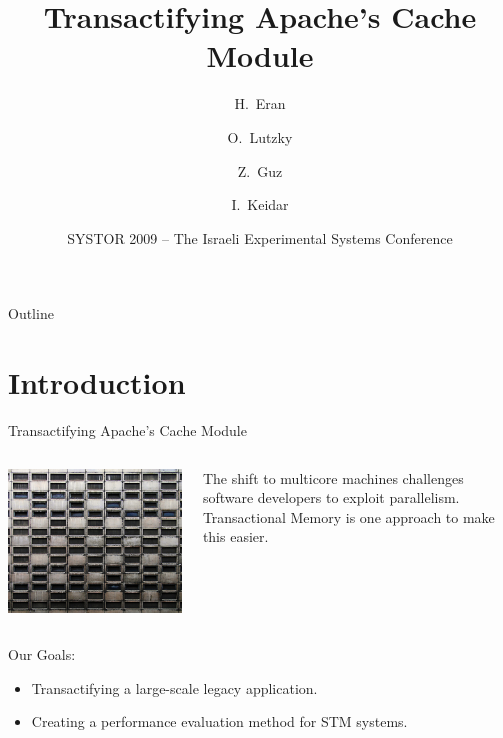 \documentclass[]{beamer}
\title{Transactifying Apache's Cache Module}
\author[Haggai Eran, Ohad Lutzky, Zvika Guz, Idit Keidar]
{H.~Eran \and O.~Lutzky \and Z.~Guz \and I.~Keidar}
\institute
{
    Department of Electrical Engineering\\
    Technion -- Israel Institute of Technology
\and
    \pgfuseimage{technion-logo-large}
}
\date[SYSTOR'09]
{SYSTOR 2009 -- The Israeli Experimental Systems Conference}
\begin{document}
\begin{frame}
    \titlepage
\end{frame}


\begin{frame}{Outline}
  \tableofcontents
\end{frame}

\section{Introduction}

\begin{frame}{Transactifying Apache's Cache Module}
\begin{columns}[T]
\begin{column}{2cm}
\includegraphics[width=\textwidth]{grid.jpg}
\end{column}
\begin{column}{8cm}
The shift to multicore machines challenges software developers to exploit
parallelism. Transactional Memory is one approach to make this easier.
\end{column}
\end{columns}
\pause

    \vspace{6pt} Our Goals:
    \begin{itemize}
        \item Transactifying a large-scale legacy application.
        \item Creating a performance evaluation method for STM systems.
    \end{itemize}    
\end{frame}
\end{document}
